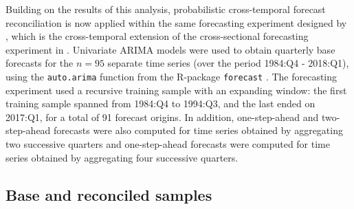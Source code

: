 \documentclass[a4paper,11pt]{article}
\theoremstyle{definition}
\begin{document}
Building on the results of this analysis, probabilistic cross-temporal forecast reconciliation is now applied within the same forecasting experiment designed by \cite{difonzo2023}, which is the cross-temporal extension of the cross-sectional forecasting experiment in \cite{athanasopoulos2020}.
Univariate ARIMA models were used to obtain quarterly base forecasts for the $n = 95$ separate time series (over the period 1984:Q4 - 2018:Q1), using the \texttt{auto.arima} function from the \textsf{R}-package \texttt{forecast} \citep{hyndman2022}. The forecasting experiment used a recursive training sample with an expanding window: the first training sample spanned from 1984:Q4 to 1994:Q3, and the last ended on 2017:Q1, for a total of 91 forecast origins. In addition, one-step-ahead and two-step-ahead forecasts were also computed for time series obtained by aggregating two successive quarters and one-step-ahead forecasts were computed for time series obtained by aggregating four successive quarters.


\subsection{Base and reconciled samples}\label{ssec:aus_br}
\end{document}
